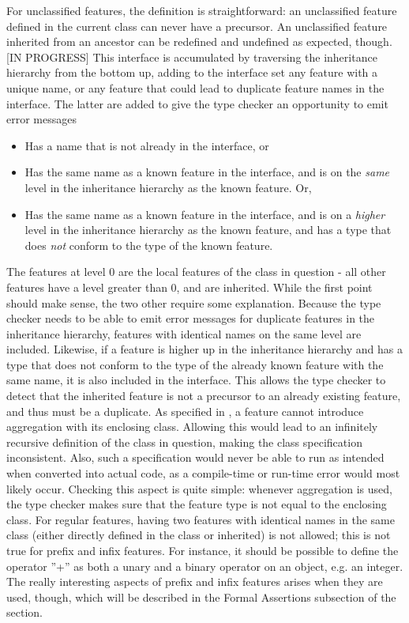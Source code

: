 For unclassified features, the definition is straightforward: an unclassified feature defined in the current class can never have a precursor. An unclassified feature inherited from an ancestor can be redefined and undefined as expected, though.
[IN PROGRESS]
 This interface is accumulated by traversing the inheritance hierarchy from the bottom up, adding to the interface set any feature with a unique name, or any feature that could lead to duplicate feature names in the interface. The latter are added to give the type checker an opportunity to emit error messages 
\begin{itemize}
\item Has a name that is not already in the interface, or
\item Has the same name as a known feature in the interface, and is on the \emph{same} level in the inheritance hierarchy as the known feature. Or,
\item Has the same name as a known feature in the interface, and is on a \emph{higher} level in the inheritance hierarchy as the known feature, and has a type that does \emph{not} conform to the type of the known feature.
\end{itemize}
The features at level 0 are the local features of the class in question - all other features have a level greater than 0, and are inherited. While the first point should make sense, the two other require some explanation. Because the type checker needs to be able to emit error messages for duplicate features in the inheritance hierarchy, features with identical names on the same level are included. Likewise, if a feature is higher up in the inheritance hierarchy and has a type that does not conform to the type of the already known feature with the same name, it is also included in the interface. This allows the type checker to detect that the inherited feature is not a precursor to an already existing feature, and thus must be a duplicate.
As specified in \cite{ostroff2001}, a feature cannot introduce aggregation with its enclosing class. Allowing this would lead to an infinitely recursive definition of the class in question, making the class specification inconsistent. Also, such a specification would never be able to run as intended when converted into actual code, as a compile-time or run-time error would most likely occur. Checking this aspect is quite simple: whenever aggregation is used, the type checker makes sure that the feature type is not equal to the enclosing class.
For regular features, having two features with identical names in the same class (either directly defined in the class or inherited) is not allowed; this is not true for prefix and infix features. For instance, it should be possible to define the operator ''+'' as both a unary and a binary operator on an object, e.g. an integer. The really interesting aspects of prefix and infix features arises when they are used, though, which will be described in the Formal Assertions subsection of the section.

